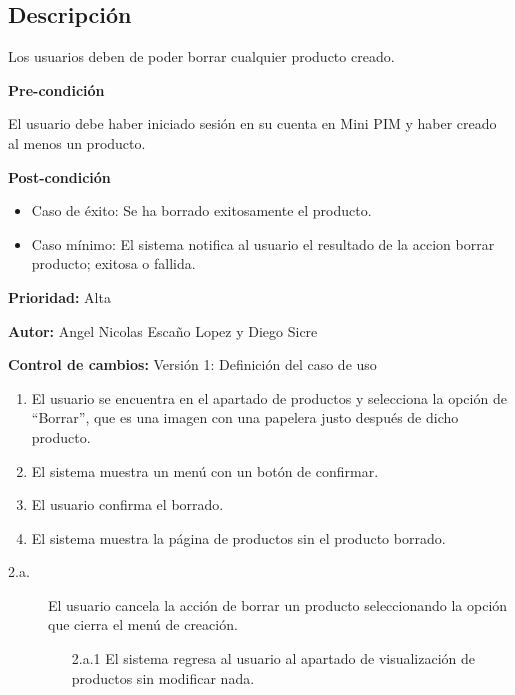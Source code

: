 
\subsection*{Descripción}
Los usuarios deben de poder borrar cualquier producto creado.\par
\vspace{0.15cm}

\textbf{Pre-condición}\par
El usuario debe haber iniciado sesión en su cuenta en Mini PIM y haber creado al menos un producto.\par
\vspace{0.15cm}

\textbf{Post-condición}
\begin{itemize}
    \item Caso de éxito: Se ha borrado exitosamente el producto.
    \item Caso mínimo: El sistema notifica al usuario el resultado de la accion borrar producto; exitosa o fallida.
\end{itemize}

\textbf{Prioridad: }
Alta
\vspace{0.15cm}

\textbf{Autor: }
Angel Nicolas Escaño Lopez y Diego Sicre\par
\vspace{0.15cm}

\textbf{Control de cambios: } Versión 1: Definición del caso de uso

\begin{enumerate}
    \item El usuario se encuentra en el apartado de productos y selecciona la opción de \enquote{Borrar}, que es una imagen con una papelera justo después de dicho producto.
    \item El sistema muestra un menú con un botón de confirmar.
    \item El usuario confirma el borrado.
    \item El sistema muestra la página de productos sin el producto borrado.
\end{enumerate}

\begin{description}
    \item[2.a.] El usuario cancela la acción de borrar un producto seleccionando la opción que cierra el menú de creación.
    \begin{enumerate}
        \item[2.a.1] El sistema regresa al usuario al apartado de visualización de productos sin modificar nada.
    \end{enumerate}
\end{description}

